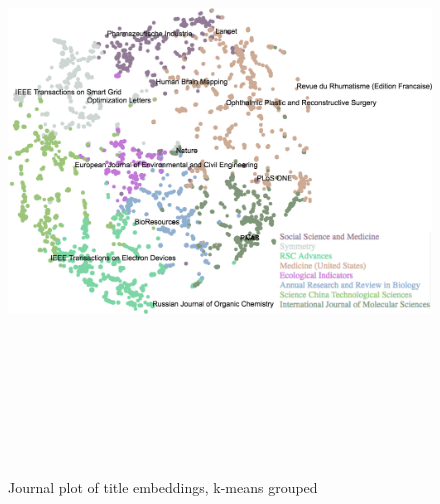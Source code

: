 \documentclass[../../paper.tex]{subfiles}
\begin{document}
\begin{landscape}
\begin{figure}
\begin{center}
\includegraphics[height=6.5in]{Plots/Journal_Plots/Title_grouped}
\end{center}
\caption{Journal plot of title embeddings, k-means grouped}\label{figure:titlePlotGrouped}
\end{figure}
\end{landscape}
\end{document}
